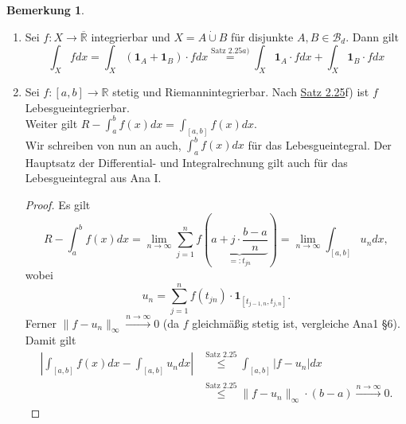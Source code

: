 \documentclass[a4paper]{report}
\newcommand{\doubleOne}{\textbf{1}}
\newcommand{\R}{\mathbb{R}}
\newcommand{\Rq}{\overline{\R}}
\newcommand{\Borel}{\mathcal{B}}
\newcommand{\toInf}{\rightarrow \infty}
\newcommand{\limToInf}[1]{\lim_{#1 \toInf}}
\newcommand{\Bd}{\Borel_d}
\newcommand{\dcup}{\dot{\cup}}
\newcommand{\jlabel}[1]{\label{j_#1}}
\newcommand{\jshortlink}[1]{\jhyperref{#1}{\text{#1}}}
\newcommand{\jhyperref}[2]{\hyperref[j_#1]{#2}}
\newcommand{\jlink}[1]{\jhyperref{#1}{#1}}
\newcommand{\jabb}[3]{ #1: #2 \rightarrow #3 }
\theoremstyle{plain}
\theoremstyle{definition}
\newtheorem{bem}[thm]{Bemerkung}
\begin{document}
{{{{\jlabel{Bem 2.26}
\begin{bem}
    \begin{enumerate}
        \item
            Sei $\jabb{f}{X}{\Rq}$ integrierbar und $X=A\dcup B$ für disjunkte $A,B\in \Bd$. Dann gilt
            \begin{displaymath}
                \int_X f dx = \int_X (\doubleOne_A + \doubleOne_B) \cdot f dx \overset{\jshortlink{Satz 2.25}a)}{=} \int_X \doubleOne_A \cdot f dx + \int_X \doubleOne_B \cdot f dx
            \end{displaymath}
        \item
            Sei $\jabb{f}{[a,b]}{\R}$ stetig und Riemannintegrierbar. Nach \jlink{Satz 2.25}f) ist $f$ Lebesgueintegrierbar.\\
            Weiter gilt $R-\int_a^b f(x)dx = \int_{[a,b]} f(x) dx$.\\
            Wir schreiben von nun an auch, $\int_a^bf(x)dx$ für das Lebesgueintegral. Der Hauptsatz der Differential- und Integralrechnung gilt auch für das Lebesgueintegral aus Ana I.
            \begin{proof}
                Es gilt 
                \begin{displaymath}
                    R-\int_a^b f(x) dx = \limToInf{n} \sum_{j=1}^n f(\underbrace{a + j\cdot \frac{b-a}{n}}_{=: t_{jn}}) = \limToInf{n} \int_{[a,b]} u_n dx,
                \end{displaymath}
                wobei
                \begin{displaymath}
                    u_n = \sum_{j=1}^n f(t_{jn})\cdot \doubleOne_{[t_{j-1,n},t_{j,n}]}.
                \end{displaymath}
                Ferner $\lVert f- u_n \rVert_\infty \xrightarrow{n\rightarrow \infty}0$ (da $f$ gleichmäßig stetig ist, vergleiche Ana1 §6). Damit gilt
                \begin{displaymath}
                    \begin{split}
                        |\int_{[a,b]} f(x)dx - \int_{[a,b]} u_n dx| &\overset{\jshortlink{Satz 2.25}}{\le} \int_{[a,b]} |f-u_n|dx \\
                        &\overset{\jshortlink{Satz 2.25}}{\le} \lVert f-u_n\rVert_\infty \cdot (b-a) \xrightarrow{n\rightarrow \infty} 0.
                    \end{split}
                \end{displaymath}
            \end{proof}

\end{enumerate}
\end{bem}}}}}
\end{document}
